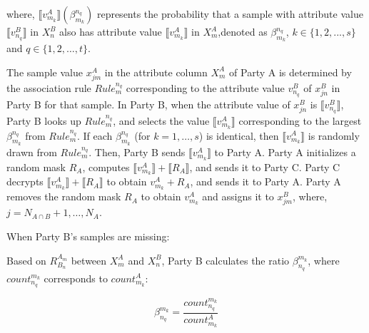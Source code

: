 \documentclass[final,1p,times]{elsarticle}
\begin{document}
where, $\llbracket v_{m_k}^A \rrbracket (\beta_{m_k}^{n_q})$ represents the probability that a sample with attribute value $\llbracket v_{n_q}^B \rrbracket$ in $X_n^B$ also has attribute value $\llbracket v_{m_k}^A \rrbracket$ in $X_m^A$,denoted as ${\beta_{m_{k}}^{n_{q}}}$, ${k}\in\{1,2,...,s\}$ and ${q}\in\{1,2,\ldots,{t}\}$.

The sample value $x_{jm}^A$ in the attribute column $X_m^A$ of Party A is determined by the association rule ${Rule_m^{n_q}}$ corresponding to the attribute value $v_{n_q}^B$ of $x_{jn}^B$ in Party B for that sample. In Party B, when the attribute value of $x_{jn}^B$ is $\llbracket v_{n_q}^B \rrbracket$, Party B looks up ${Rule_m^{n_q}}$, and selects the value $\llbracket v_{m_k}^A \rrbracket$ corresponding to the largest ${\beta_{m_k}^{n_q}}$ from ${Rule_m^{n_q}}$. If each \( \beta_{m_k}^{n_q} \) (for \( k=1,\dots,s \)) is identical, then \( \llbracket v_{m_k}^A \rrbracket \) is randomly drawn from \( {Rule}_m^{n_q} \). Then, Party B sends \( \llbracket v_{m_k}^A \rrbracket \) to Party A. Party A initializes a random mask $R_A$, computes ${\llbracket v_{m_k}^A \rrbracket}+ \llbracket {R_A} \rrbracket$, and sends it to Party C. Party C decrypts ${\llbracket v_{m_k}^A \rrbracket}+ \llbracket {R_A} \rrbracket$ to obtain ${v_{m_{k}}^A+R_A}$, and sends it to Party A. Party A removes the random mask $R_A$ to obtain ${v_{m_k}^A}$ and assigns it to $x_{jm}^B$, where, ${j=N_{{A}\cap {B}}+1,\ldots,N_{A}}$.

When Party B's samples are missing:


Based on \( R_{B_n}^{A_m} \) between \( X_m^A \) and \( X_n^B \), Party B calculates the ratio ${\beta_{n_q}^{m_k}}$, where ${count}_{n_q}^{m_k}$  corresponds to ${count}_{{m_k}}^{{A}}$:

\begin{equation}
	{\beta_{n_q}^{m_k}=\frac{count_{n_q}^{m_k}}{count_{m_k}^A}}
\end{equation}\textbf{}
\end{document}
